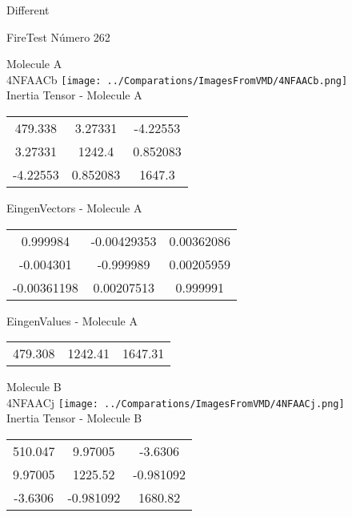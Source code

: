 \begin{center}
\vtab
\vtab
\textcolor{NavyBlue}{\Large Different}
\end{center}

 \newpage

\vtab[-2cm]
\begin{center}
{\large FireTest \tab Número 262}
\end{center}
\begin{multicols}{2}
\begin{center}

Molecule A \\ 
4NFAACb
\texttt{[image: ../Comparations/ImagesFromVMD/4NFAACb.png]}
\\
Inertia Tensor - Molecule A \\
\vtab

\begin{tabular}{|c c c|}
479.338	 & 	3.27331	 & 	-4.22553	 \\
3.27331	 & 	1242.4	 & 	0.852083	 \\
-4.22553	 & 	0.852083	 & 	1647.3
\end{tabular}

\vtab
 EingenVectors - Molecule A     \\
\vtab
\begin{tabular}{|c c c|}
0.999984	 & 	-0.00429353	 & 	0.00362086	 \\
-0.004301	 & 	-0.999989	 & 	0.00205959	 \\
-0.00361198	 & 	0.00207513	 & 	0.999991
\end{tabular}

\vtab
 EingenValues - Molecule A     \\
\vtab
\begin{tabular}{|c c c|}
479.308	 & 	1242.41	 & 	1647.31	 \\
\end{tabular}
\columnbreak

Molecule B \\ 
4NFAACj
\texttt{[image: ../Comparations/ImagesFromVMD/4NFAACj.png]}
\\
Inertia Tensor - Molecule B \\
\vtab

\begin{tabular}{|c c c|}
510.047	 & 	9.97005	 & 	-3.6306	 \\
9.97005	 & 	1225.52	 & 	-0.981092	 \\
-3.6306	 & 	-0.981092	 & 	1680.82
\end{tabular}


\end{center}
\end{multicols}
